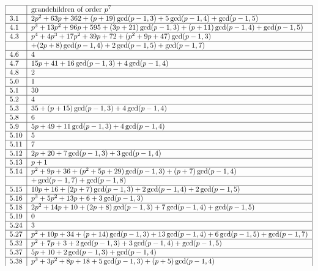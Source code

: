 \documentclass[10pt]{article}
\begin{document}
{\small 
\[
\begin{tabular}{|l|l|}
\hline
& grandchildren of order $p^{7}$ \\ \hline
3.1 & $2p^{2}+63p+362+(p+19)\gcd (p-1,3)+5\gcd (p-1,4)+\gcd (p-1,5)$ \\ 
\hline
4.1 & $p^{3}+13p^{2}+96p+595+(3p+21)\gcd (p-1,3)+(p+11)\gcd (p-1,4)+\gcd
(p-1,5)$ \\ \hline
4.3 & $p^{4}+\allowbreak 4p^{3}+\allowbreak 17p^{2}+39p+72+(p^{2}+9p+47)\gcd
(p-1,3)$ \\ \hline
& $+(2p+8)\gcd (p-1,4)+2\gcd (p-1,5)+\gcd (p-1,7)$ \\ \hline
4.6 & $4$ \\ \hline
4.7 & $15p+41+16\gcd (p-1,3)+4\gcd (p-1,4)$ \\ \hline
4.8 & $2$ \\ \hline
5.0 & $1$ \\ \hline
5.1 & $30$ \\ \hline
5.2 & $4$ \\ \hline
5.3 & $35+(p+15)\gcd (p-1,3)+4\gcd (p-1,4)$ \\ \hline
5.8 & $6$ \\ \hline
5.9 & $5p+49+11\gcd (p-1,3)+4\gcd (p-1,4)$ \\ \hline
5.10 & $5$ \\ \hline
5.11 & $7$ \\ \hline
5.12 & $2p+20+7\gcd (p-1,3)+3\gcd (p-1,4)$ \\ \hline
5.13 & $p+1$ \\ \hline
5.14 & $p^{2}+9p+36+(p^{2}+5p+29)\gcd (p-1,3)+(p+7)\gcd (p-1,4)$ \\ \hline
& $+\gcd (p-1,7)+\gcd (p-1,8)$ \\ \hline
5.15 & $10p+16+(2p+7)\gcd (p-1,3)+2\gcd (p-1,4)+2\gcd (p-1,5)$ \\ \hline
5.16 & $p^{3}+5p^{2}+13p+6+3\gcd (p-1,3)$ \\ \hline
5.18 & $2p^{2}+14p+10+(2p+8)\gcd (p-1,3)+7\gcd (p-1,4)+\gcd (p-1,5)$ \\ 
\hline
5.19 & $0$ \\ \hline
5.24 & $3$ \\ \hline
5.27 & $p^{2}+10p+34+(p+14)\gcd (p-1,3)+13\gcd (p-1,4)+6\gcd (p-1,5)+\gcd
(p-1,7)$ \\ \hline
5.32 & $p^{2}+7p+3+2\gcd (p-1,3)+3\gcd (p-1,4)+\gcd (p-1,5)$ \\ \hline
5.37 & $5p+10+2\gcd (p-1,3)+\gcd (p-1,4)$ \\ \hline
5.38 & $p^{3}+\allowbreak 3p^{2}+8p+18+5\gcd (p-1,3)+(p+5)\gcd (p-1,4)$ \\ 

\end{tabular}\]}
\end{document}
